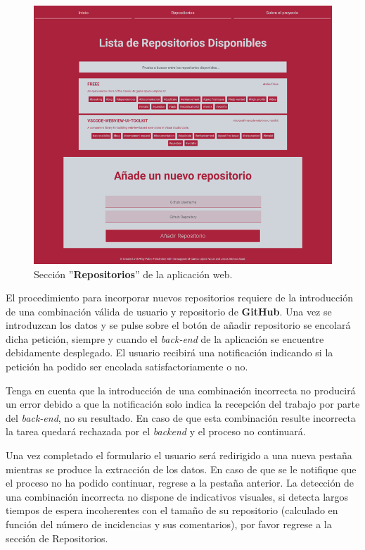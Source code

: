 \begin{figure}[!ht]
	\centering
    \includegraphics[width=\textwidth]{img/webapp_list_and_get_repo.png}
	\caption{Sección ''\textbf{Repositorios}'' de la aplicación web.}
	\label{fig:webapp_list_and_get_repo}
\end{figure}

El procedimiento para incorporar nuevos repositorios requiere de la introducción de una combinación válida de usuario y repositorio de \textbf{GitHub}. Una vez se introduzcan los datos y se pulse sobre el botón de añadir repositorio se encolará dicha petición, siempre y cuando el \textit{back-end} de la aplicación se encuentre debidamente desplegado. El usuario recibirá una notificación indicando si la petición ha podido ser encolada satisfactoriamente o no.

Tenga en cuenta que la introducción de una combinación incorrecta no producirá un error debido a que la notificación solo indica la recepción del trabajo por parte del \textit{back-end}, no su resultado. En caso de que esta combinación resulte incorrecta la tarea quedará rechazada por el \textit{backend} y el proceso no continuará.

Una vez completado el formulario el usuario será redirigido a una nueva pestaña mientras se produce la extracción de los datos. En caso de que se le notifique que el proceso no ha podido continuar, regrese a la pestaña anterior. La detección de una combinación incorrecta no dispone de indicativos visuales, si detecta largos tiempos de espera incoherentes con el tamaño de su repositorio (calculado en función del número de incidencias y sus comentarios), por favor regrese a la sección de Repositorios.


